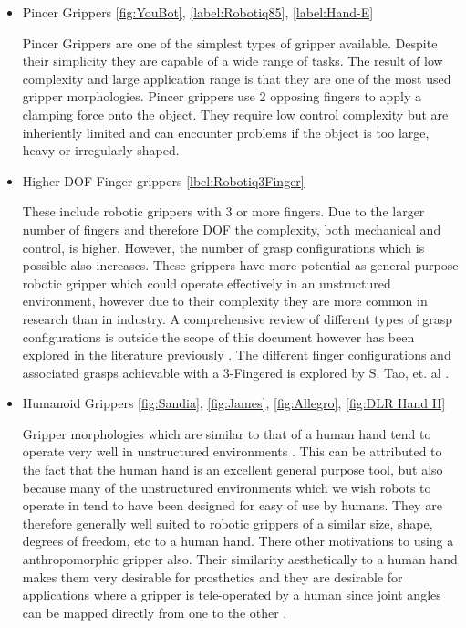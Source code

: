 \begin{itemize}
    \item Pincer Grippers \ref{fig:YouBot}, \ref{label:Robotiq85}, \ref{label:Hand-E}
    
    Pincer Grippers are one of the simplest types of gripper available. Despite their simplicity they are capable of a wide range of tasks. The result of low complexity and large application range is that they are one of the most used gripper morphologies. Pincer grippers use 2 opposing fingers to apply a clamping force onto the object. They require low control complexity but are inheriently limited and can encounter problems if the object is too large, heavy or irregularly shaped.
    
    \item Higher DOF Finger grippers \ref{lbel:Robotiq3Finger}
    
    These include robotic grippers with 3 or more fingers. Due to the larger number of fingers and therefore DOF the complexity, both mechanical and control, is higher. However, the number of grasp configurations which is possible also increases. These grippers have more potential as general purpose robotic gripper which could operate effectively in an unstructured environment, however due to their complexity they are more common in research than in industry. A comprehensive review of different types of grasp configurations is outside the scope of this document however has been explored in the literature previously \cite{GRASPTaxonomy}. The different finger configurations and associated grasps achievable with a 3-Fingered is explored by S. Tao, et. al \cite{Reconf3Finger}.
    
    
    \item Humanoid Grippers \ref{fig:Sandia}, \ref{fig:James}, \ref{fig:Allegro}, \ref{fig:DLR Hand II}
    
    Gripper morphologies which are similar to that of a human hand tend to operate very well in unstructured environments \cite{pneumaticAnthropomorphicHand,Mahmoud2010}. 
    This can be attributed to the fact that the human hand is an excellent general purpose tool, but also because many of the unstructured environments which we wish robots to operate in tend to have been designed for easy of use by humans. They are therefore generally well suited to robotic grippers of a similar size, shape, degrees of freedom, etc to a human hand. There other motivations to using a anthropomorphic gripper also. Their similarity aesthetically to a human hand makes them very desirable for prosthetics and they are desirable for applications where a gripper is tele-operated by a human since joint angles can be mapped directly from one to the other \cite{AnthroHandReview}.
    

\end{itemize}
